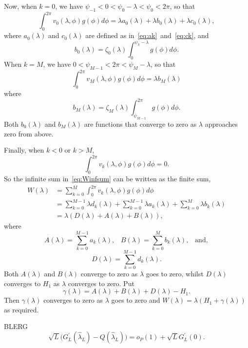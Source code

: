 \documentclass[journal]{IEEEtran}
\begin{document}
\begin{IEEEproof}
Now, when $k = 0$, we have $\psi_{-1} < 0 < \psi_0 - \lambda < \psi_0 < 2\pi$, so that
\[
\int_0^{2\pi} v_0(\lambda, \phi) g(\phi) d\phi = \lambda a_0(\lambda) + \lambda b_0(\lambda) +  \lambda c_0(\lambda),
\]
where $a_0(\lambda)$ and $c_0(\lambda)$ are defined as in~\eqref{eq:ak}~and~\eqref{eq:ck}, and
\[
b_0(\lambda) = \zeta_0(\lambda) \int_{0}^{\psi_k-\lambda} g(\phi) d\phi.
\]
When $k = M$, we have $0 < \psi_{M-1} < 2\pi < \psi_{M} - \lambda$, so that
\[
\int_0^{2\pi} v_{M}(\lambda, \phi) g(\phi) d\phi = \lambda b_{M}(\lambda)
\]
where 
\[
b_{M}(\lambda) = \zeta_{M}(\lambda) \int_{\psi_{M-1}}^{2\pi}g(\phi) d\phi.
\]
Both $b_0(\lambda)$ and $b_M(\lambda)$ are functions that converge to zero as $\lambda$ approaches zero from above.
 
Finally, when $k < 0$ or $k > M$, 
\[
\int_0^{2\pi} v_k(\lambda, \phi) g(\phi) d\phi = 0.
\]
So the infinite sum in~\eqref{eq:Winfsum} can be written as the finite sum,
\begin{align*}
W(\lambda) &= \sum_{k=0}^{M} \int_{0}^{2\pi} v_k(\lambda, \phi) g(\phi) d\phi \\
&= \sum_{k=0}^{M-1} \lambda d_k(\lambda) + \sum_{k=0}^{M-1} \lambda a_k(\lambda) + \sum_{k=0}^{M} \lambda b_k(\lambda) \\
&= \lambda \left( D(\lambda)  + A(\lambda) + B(\lambda) \right),
\end{align*}
where 
\[
A(\lambda) = \sum_{k=0}^{M-1} a_k(\lambda), \;\;\; B(\lambda) = \sum_{k=0}^{M} b_k(\lambda), \;\;\; \text{and},
\]
\[
D(\lambda) = \sum_{k=0}^{M-1} d_k(\lambda).
\]
Both $A(\lambda)$ and $B(\lambda)$ converge to zero as $\lambda$ goes to zero, whilst $D(\lambda)$ converges to $H_1$ as $\lambda$ converges to zero.  Put
\[
\gamma(\lambda) = A(\lambda) + B(\lambda) + D(\lambda) - H_1.
\]
Then $\gamma(\lambda)$ converges to zero as $\lambda$ goes to zero and $W(\lambda) = \lambda(H_1 + \gamma(\lambda))$ as required.
\end{IEEEproof}

\begin{lemma}\label{lem:empiricprocc} BLERG
\[
\sqrt{L}\big( G_L^\prime(\hat{\lambda}_L) - Q(\hat{\lambda}_L) \big) = o_P(1) + \sqrt{L} G_L^\prime(0).
\]
\end{lemma}
\begin{IEEEproof}

\end{IEEEproof}
\end{document}
